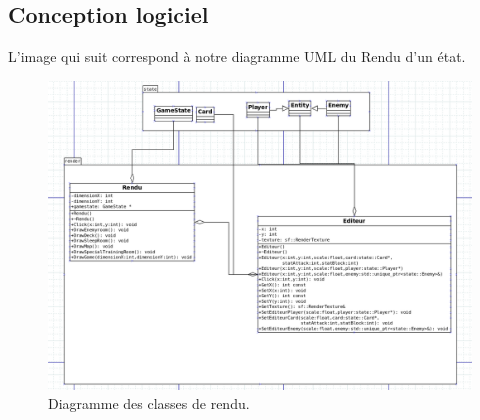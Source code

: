 \subsection{Conception logiciel}

L'image qui suit correspond à notre diagramme UML du Rendu d'un état.

\begin{figure}[p]
\includegraphics[width = 15cm]{images/render.png}
\caption{\label{uml:render}Diagramme des classes de rendu.} 
\end{figure}


\clearpage

